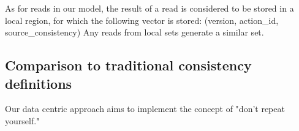 \documentclass[preprint, numbers]{sigplanconf}
\begin{document}
As for reads in our model, the result of a read is considered to be stored in a
local region, for which the following vector is stored:  (version, action\_id,
source\_consistency) Any reads from local sets generate a similar set.

\subsection{Comparison to traditional consistency definitions}
Our data centric approach aims to implement the concept of "don't repeat
yourself."



%



%
\end{document}
